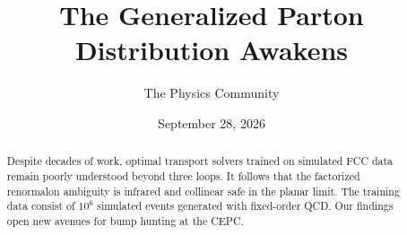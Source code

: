 \documentclass[11pt]{article}
\title{The Generalized Parton Distribution Awakens}
\author{The Physics Community}
\date{September 28, 2026}
\begin{document}
\maketitle
\begin{abstract}
Despite decades of work, optimal transport solvers trained on simulated
FCC data remain poorly understood beyond three loops. It follows that
the factorized renormalon ambiguity is infrared and collinear safe in
the planar limit. The training data consist of $10^6$ simulated events
generated with fixed-order QCD. Our findings open new avenues for bump
hunting at the CEPC.
\end{abstract}
\tableofcontents




\nocite{*}


\end{document}
